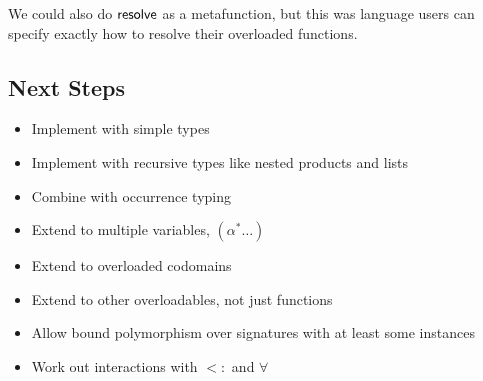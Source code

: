 \documentclass{article}
\begin{document}
\begin{mathpar}




\end{mathpar}
We could also do $\kres$ as a metafunction, but this was language users can specify exactly how to resolve their overloaded functions.


\subsection*{Next Steps}
\begin{itemize}
\item Implement with simple types
\item Implement with recursive types like nested products and lists
\item Combine with occurrence typing
\item Extend to multiple variables, $(\alpha^* \ldots)$
\item Extend to overloaded codomains
\item Extend to other overloadables, not just functions
\item Allow bound polymorphism over signatures with at least some instances
\item Work out interactions with $<:$ and $\forall$
\end{itemize}
\end{document}
